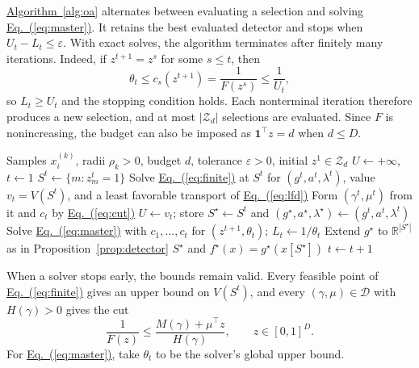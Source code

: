 \documentclass[11pt,a4paper]{article}
\newcommand{\Eqref}[1]{\hyperref[#1]{Eq.~(\ref*{#1})}}
\newcommand{\Algref}[1]{\hyperref[#1]{Algorithm~\ref*{#1}}}
\theoremstyle{plain}
\begin{document}
\Algref{alg:oa} alternates between evaluating a selection and solving
\Eqref{eq:master}. It retains the best evaluated detector and stops
when $U_t-L_t\le\varepsilon$. With exact solves, the algorithm
terminates after finitely many iterations. Indeed, if $z^{t+1}=z^s$ for
some $s\le t$, then
\[
\theta_t\le c_s(z^{t+1})=\frac1{F(z^s)}\le\frac1{U_t},
\]
so $L_t\ge U_t$ and the stopping condition holds. Each nonterminal
iteration therefore produces a new selection, and at most
$|\mathcal Z_d|$ selections are evaluated. Since $F$ is nonincreasing,
the budget can also be imposed as $\mathbf1^\top z=d$ when $d\le D$.

\begin{algorithm}[htbp]
\caption{Outer approximation for variable selection}\label{alg:oa}
\begin{algorithmic}[1]
\Require Samples $x_i^{(k)}$, radii $\rho_k>0$, budget $d$,
 tolerance $\varepsilon>0$, initial $z^1\in\mathcal Z_d$
\State $U\gets+\infty$, $t\gets1$
\Loop
  \State $S^t\gets\{m:z_m^t=1\}$
  \State Solve \Eqref{eq:finite} at $S^t$ for $(g^t,a^t,\lambda^t)$,
  value $v_t=V(S^t)$, and a least favorable transport of \Eqref{eq:lfd}
  \State Form $(\gamma^t,\mu^t)$ from it and $c_t$ by \Eqref{eq:cut}
    \State $U\gets v_t$; store $S^\star\gets S^t$ and
    $(g^\star,a^\star,\lambda^\star)\gets(g^t,a^t,\lambda^t)$
  \EndIf
  \State Solve \Eqref{eq:master} with $c_1,\ldots,c_t$ for
  $(z^{t+1},\theta_t)$; $L_t\gets1/\theta_t$
    \State Extend $g^\star$ to $\mathbb R^{|S^\star|}$ as in
    Proposition~\ref{prop:detector}
    \State \Return $S^\star$ and $f^\star(x)=g^\star(x[S^\star])$
  \EndIf
  \State $t\gets t+1$
\EndLoop
\end{algorithmic}
\end{algorithm}
When a solver stops early, the bounds remain valid. Every feasible
point of \Eqref{eq:finite} gives an upper bound on $V(S^t)$, and every
$(\gamma,\mu)\in\mathcal D$ with $H(\gamma)>0$ gives the cut
\[
\frac1{F(z)}\le\frac{M(\gamma)+\mu^\top z}{H(\gamma)},
\qquad z\in[0,1]^D.
\]
For \Eqref{eq:master}, take $\theta_t$ to be the solver's global upper
bound.

\FloatBarrier
\appendix
{}
\setlength{\abovedisplayskip}{4pt plus 1pt minus 1pt}
\setlength{\belowdisplayskip}{4pt plus 1pt minus 1pt}
\end{document}
